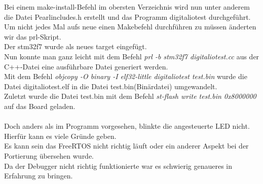 Bei einem make-install-Befehl im obersten Verzeichnis wird nun unter anderem die Datei Pearlincludes.h erstellt und das Programm digitaliotest durchgeführt.\\
Um nicht jedes Mal aufs neue einen Makebefehl durchführen zu müssen änderten wir das prl-Skript.\\ 
Der stm32f7 wurde als neues target eingefügt.\\
Nun konnte man ganz leicht mit dem Befehl {\textit{prl -b stm32f7 digitaliotest.cc}} aus der C++-Datei eine ausführbare Datei generiert werden.\\
Mit dem Befehl {\textit{objcopy -O binary -I elf32-little digitaliotest test.bin}} wurde die Datei digitaliotest.elf in die Datei test.bin(Binärdatei) umgewandelt.\\
Zuletzt wurde die Datei test.bin mit dem Befehl {\textit{st-flash write test.bin 0x8000000}} auf das Board geladen.\\
\\
Doch anders als im Programm vorgesehen, blinkte die angesteuerte LED nicht.\\
Hierfür kann es viele Gründe geben.\\
Es kann sein das FreeRTOS nicht richtig läuft oder ein anderer Aspekt bei der Portierung übersehen wurde.\\
Da der Debugger nicht richtig funktionierte war es schwierig genaueres in Erfahrung zu bringen.\\
